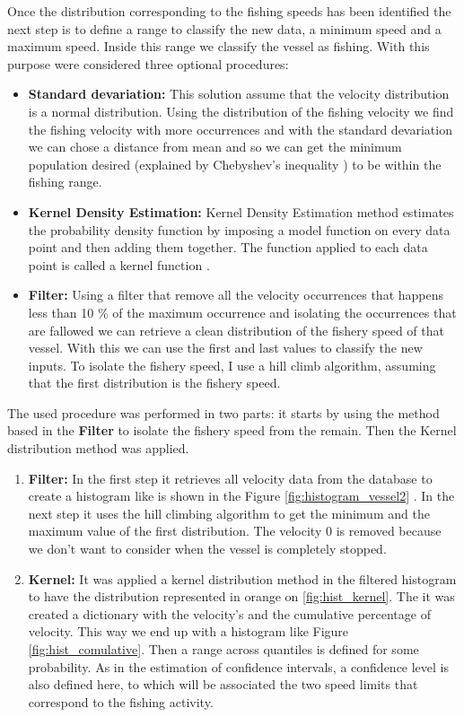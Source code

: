 Once the distribution corresponding to the fishing speeds has been identified the next step is to define a range to classify the new data, a minimum speed and a maximum speed.
Inside this range we classify the vessel as fishing. With this purpose were considered three optional procedures:
\begin{itemize}
\item	\textbf{Standard devariation:}
This solution assume that the velocity distribution is a normal distribution.   Using the distribution of the fishing velocity we find the fishing velocity with more occurrences and with the standard devariation we can chose a distance from mean and so we can get the minimum population desired (explained by Chebyshev’s inequality \cite{Chebyshevinequality}) to be within the fishing range. 

\item	\textbf{Kernel Density Estimation:}
Kernel Density Estimation method estimates the probability density function by imposing a model function on every data point and then adding them together. The function applied to each data point is called a kernel function \cite{KernelDensityEstimation}.

\item	\textbf{Filter:}
Using a filter that remove all the velocity occurrences that happens less than 10 \% of the maximum occurrence and isolating the occurrences that are fallowed we can retrieve a clean distribution of the fishery speed of that vessel.  With this we can use the first and last values to classify the new inputs. To isolate the fishery speed, I use a hill climb algorithm, assuming that the first distribution is the fishery speed.
\end{itemize}

The used procedure was performed in two parts:  it starts by using the method based in the \textbf{Filter} to isolate the fishery speed from the remain. Then the Kernel distribution method was applied.
\begin{enumerate}


\item	\textbf{Filter:} In the first step it retrieves all velocity data from the database to create a histogram like is shown in the Figure \ref{fig:histogram_vessel2} . In the next step it uses the hill climbing algorithm to get the minimum and the maximum value of the first distribution. The velocity 0 is removed because we don’t want to consider when the vessel is completely stopped. 
\item	\textbf{Kernel:} It was applied a kernel distribution method in the filtered histogram to have the distribution represented in orange on \ref{fig:hist_kernel}. The it was created a dictionary with the velocity’s and the cumulative percentage of velocity. This way we end up with a histogram like Figure \ref{fig:hist_comulative}.  
Then a range across quantiles is defined for some probability. As in the estimation of confidence intervals, a confidence level is also defined here, to which will be associated the two speed limits that correspond to the fishing activity.
\end{enumerate}  

